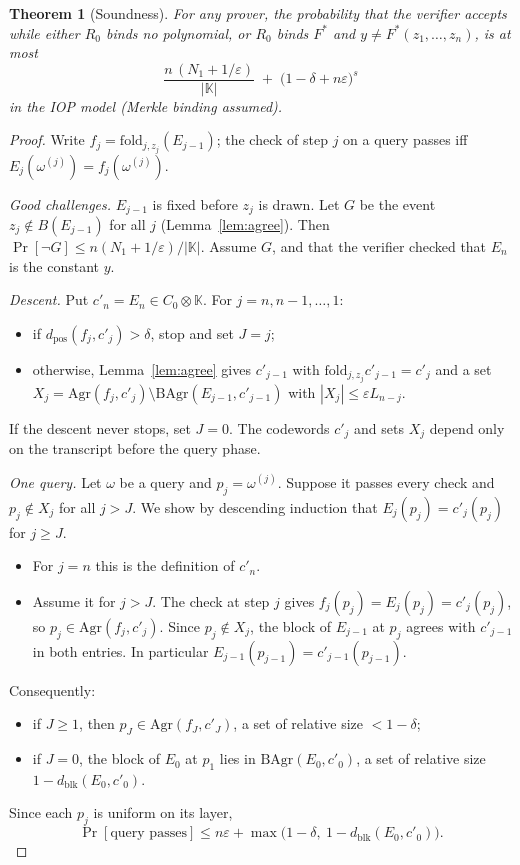 \documentclass[11pt]{article}
\newtheorem{theorem}{Theorem}[section]
\theoremstyle{definition}
\newcommand{\K}{\mathbb{K}}
\newcommand{\fold}{\mathrm{fold}}
\newcommand{\dpos}{d_{\mathrm{pos}}}
\newcommand{\dblk}{d_{\mathrm{blk}}}
\begin{document}
\begin{theorem}[Soundness]\label{thm:sound}
For any prover, the probability that the verifier accepts while either $R_0$ binds no polynomial,
or $R_0$ binds $F^{*}$ and $y\neq F^{*}(z_1,\dots,z_n)$, is at most
\[
\frac{n\,(N_1+1/\varepsilon)}{|\K|}\;+\;\bigl(1-\delta+n\varepsilon\bigr)^{s}
\]
in the IOP model (Merkle binding assumed).
\end{theorem}
\begin{proof}
Write $f_j=\fold_{j,z_j}(E_{j-1})$; the check of step $j$ on a query passes iff
$E_j(\omega^{(j)})=f_j(\omega^{(j)})$.

\emph{Good challenges.} $E_{j-1}$ is fixed before $z_j$ is drawn. Let $G$ be the event
$z_j\notin B(E_{j-1})$ for all $j$ (Lemma~\ref{lem:agree}). Then
$\Pr[\neg G]\le n(N_1+1/\varepsilon)/|\K|$. Assume $G$, and that the verifier checked that $E_n$ is
the constant $y$.

\emph{Descent.} Put $c'_n=E_n\in C_0\otimes\K$. For $j=n,n-1,\dots,1$:
\begin{itemize}[leftmargin=*]
\item if $\dpos(f_j,c'_j)>\delta$, stop and set $J=j$;
\item otherwise, Lemma~\ref{lem:agree} gives $c'_{j-1}$ with $\fold_{j,z_j}c'_{j-1}=c'_j$ and a set
$X_j=\mathrm{Agr}(f_j,c'_j)\setminus\mathrm{BAgr}(E_{j-1},c'_{j-1})$ with
$|X_j|\le\varepsilon L_{n-j}$.
\end{itemize}
If the descent never stops, set $J=0$.
The codewords $c'_j$ and sets $X_j$ depend only on the transcript before the query phase.

\emph{One query.} Let $\omega$ be a query and $p_j=\omega^{(j)}$. Suppose it passes every check
and $p_j\notin X_j$ for all $j>J$. We show by descending induction that $E_j(p_j)=c'_j(p_j)$ for
$j\ge J$.
\begin{itemize}[leftmargin=*]
\item For $j=n$ this is the definition of $c'_n$.
\item Assume it for $j>J$. The check at step $j$ gives $f_j(p_j)=E_j(p_j)=c'_j(p_j)$, so
$p_j\in\mathrm{Agr}(f_j,c'_j)$. Since $p_j\notin X_j$, the block of $E_{j-1}$ at $p_j$ agrees with
$c'_{j-1}$ in both entries. In particular $E_{j-1}(p_{j-1})=c'_{j-1}(p_{j-1})$.
\end{itemize}
Consequently:
\begin{itemize}[leftmargin=*]
\item if $J\ge1$, then $p_J\in\mathrm{Agr}(f_J,c'_J)$, a set of relative size $<1-\delta$;
\item if $J=0$, the block of $E_0$ at $p_1$ lies in $\mathrm{BAgr}(E_0,c'_0)$, a set of relative size
$1-\dblk(E_0,c'_0)$.
\end{itemize}
Since each $p_j$ is uniform on its layer,
\[
\Pr[\text{query passes}]\le n\varepsilon+\max\bigl(1-\delta,\ 1-\dblk(E_0,c'_0)\bigr).
\]


\end{proof}
\end{document}
